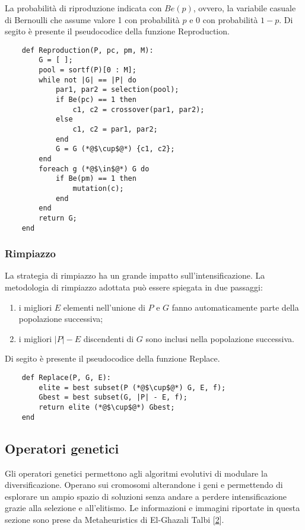 La probabilità di riproduzione indicata con $Be(p)$, ovvero, la variabile casuale di Bernoulli che assume valore 1 con probabilità $p$ e 0 con probabilità $1-p$. Di segito è presente il pseudocodice della funzione Reproduction.

\begin{lstlisting}
    def Reproduction(P, pc, pm, M):
        G = [ ];
        pool = sortf(P)[0 : M];
        while not |G| == |P| do
            par1, par2 = selection(pool);
            if Be(pc) == 1 then
                c1, c2 = crossover(par1, par2);
            else
                c1, c2 = par1, par2;
            end
            G = G (*@$\cup$@*) {c1, c2};
        end
        foreach g (*@$\in$@*) G do
            if Be(pm) == 1 then
                mutation(c);
            end
        end
        return G;
    end
\end{lstlisting}

\subsubsection{Rimpiazzo}
La strategia di rimpiazzo ha un grande impatto sull'intensificazione. La metodologia di rimpiazzo adottata può essere spiegata in due passaggi: 
\begin{enumerate}
    \item i migliori $E$ elementi nell'unione di $P$ e $G$ fanno automaticamente parte della popolazione successiva;
    \item i migliori $|P| - E$ discendenti di $G$ sono inclusi nella popolazione successiva.
\end{enumerate}

\noindent Di segito è presente il pseudocodice della funzione Replace.

\begin{lstlisting}
    def Replace(P, G, E):
        elite = best subset(P (*@$\cup$@*) G, E, f);
        Gbest = best subset(G, |P| - E, f);
        return elite (*@$\cup$@*) Gbest;
    end
\end{lstlisting}

\subsection{Operatori genetici} \hypertarget{og}{}

Gli operatori genetici permettono agli algoritmi evolutivi di modulare la diversificazione. Operano sui cromosomi alterandone i geni e permettendo di esplorare un ampio spazio di soluzioni senza andare a perdere intensificazione grazie alla selezione e all'elitismo. Le informazioni e immagini riportate in questa sezione sono prese da Metaheuristics di El-Ghazali Talbi [\hyperlink{bibliografia}{2}].

